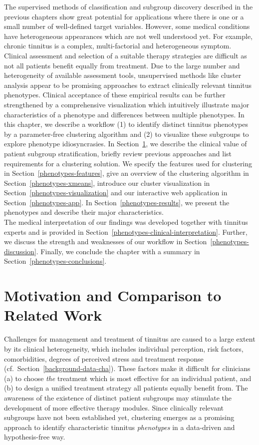 \documentclass[
  oneside]{book}
\begin{document}
The supervised methods of classification and subgroup discovery described in the previous chapters show great potential for applications where there is one or a small number of well-defined target variables.
However, some medical conditions have heterogeneous appearances which are not well understood yet.
For example, chronic tinnitus is a complex, multi-factorial and heterogeneous symptom.
Clinical assessment and selection of a suitable therapy strategies are difficult as not all patients benefit equally from treatment.
Due to the large number and heterogeneity of available assessment tools, unsupervised methods like cluster analysis appear to be promising approaches to extract clinically relevant tinnitus phenotypes.
Clinical acceptance of these empirical results can be further strengthened by a comprehensive visualization which intuitively illustrate major characteristics of a phenotype and differences between multiple phenotypes.
In this chapter, we describe a workflow (1) to identify distinct tinnitus phenotypes by a parameter-free clustering algorithm and (2) to visualize these subgroups to explore phenotype idiosyncrasies.
In Section~\ref{phenotypes-motivation}, we describe the clinical value of patient subgroup stratification, briefly review previous approaches and list requirements for a clustering solution.
We specify the features used for clustering in Section~\ref{phenotypes-features}, give an overview of the clustering algorithm in Section~\ref{phenotypes-xmeans}, introduce our cluster visualization in Section~\ref{phenotypes-visualization} and our interactive web application in Section~\ref{phenotypes-app}.
In Section~\ref{phenotypes-results}, we present the phenotypes and describe their major characteristics.\\
The medical interpretation of our findings was developed together with tinnitus experts and is provided in Section~\ref{phenotypes-clinical-interpretation}.
Further, we discuss the strength and weaknesses of our workflow in Section~\ref{phenotypes-discussion}.
Finally, we conclude the chapter with a summary in Section~\ref{phenotypes-conclusions}.

\hypertarget{phenotypes-motivation}{%
\section{Motivation and Comparison to Related Work}\label{phenotypes-motivation}}

Challenges for management and treatment of tinnitus are caused to a large extent by its clinical heterogeneity, which includes individual perception, risk factors, comorbidities, degrees of perceived stress and treatment response (cf.~Section~\ref{background-data-cha}).
These factors make it difficult for clinicians (a) to choose \emph{the} treatment which is most effective for an individual patient, and (b) to design a unified treatment strategy all patients equally benefit from.
The awareness of the existence of distinct patient subgroups may stimulate the development of more effective therapy modules.
Since clinically relevant subgroups have not been established yet, clustering emerges as a promising approach to identify characteristic tinnitus \emph{phenotypes} in a data-driven and hypothesis-free way.
\end{document}
